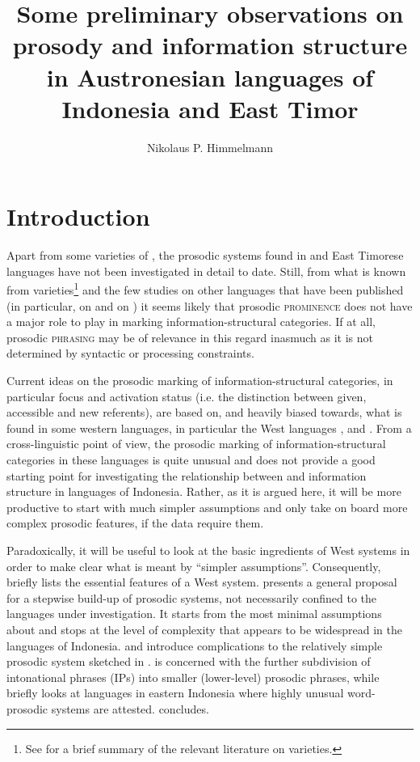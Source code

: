 \documentclass[output=paper
,modfonts
,nonflat]{langsci/langscibook}
\title{Some preliminary observations on prosody and information structure in Austronesian languages of Indonesia and East Timor}
\author{Nikolaus P. Himmelmann\affiliation{Universität zu Köln}}
\begin{document}
	
\maketitle

\section{\label{s:himmelmann:1}Introduction}

\largerpage
Apart from some varieties of , the prosodic systems found in  and East Timorese languages have not been investigated in detail to date. Still, from what is known from  varieties\footnote{See  for a brief summary of the relevant literature on  varieties.} and the few studies on other languages that have been published (in particular, \citealt{Stoel2006} on  and \citealt{Himmelmann2010} on ) it seems likely that prosodic \textsc{prominence} does not have a major role to play in marking information-structural categories. If at all, prosodic \textsc{phrasing} may be of relevance in this regard inasmuch as it is not determined by syntactic or processing constraints.

Current ideas on the prosodic marking of information-structural categories, in particular focus and activation status (i.e. the distinction between given, accessible and new  referents), are based on, and heavily biased towards, what is found in some western  languages, in particular the West  languages ,  and . From a cross-linguistic point of view, the prosodic marking of information-structural categories in these languages is quite unusual and does not provide a good starting point for investigating the relationship between  and information structure in  languages of Indonesia. Rather, as it is argued here, it will be more productive to start with much simpler assumptions and only take on board more complex prosodic features, if the data require them. 

Paradoxically, it will be useful to look at the basic ingredients of West  systems in order to make clear what is meant by “simpler assumptions”. Consequently,  briefly lists the essential features of a West  system.  presents a general proposal for a stepwise build-up of prosodic systems, not necessarily confined to the languages under investigation. It starts from the most minimal assumptions about  and stops at the level of complexity that appears to be widespread in the languages of Indonesia.  and  introduce complications to the relatively simple prosodic system sketched in .  is concerned with the further subdivision of intonational phrases (IPs) into smaller (lower-level) prosodic phrases, while  briefly looks at languages in eastern Indonesia where highly unusual word-prosodic systems are attested.  concludes.
\end{document}
